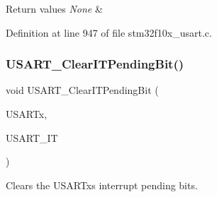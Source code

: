 \begin{DoxyRetVals}{Return values}
{\em None} & \\
\hline
\end{DoxyRetVals}


Definition at line 947 of file stm32f10x\+\_\+usart.\+c.

\mbox{\label{group___u_s_a_r_t___private___functions_ga1fc25d0338695063be5e50156955d9bc}} 
\subsubsection{\texorpdfstring{U\+S\+A\+R\+T\+\_\+\+Clear\+I\+T\+Pending\+Bit()}{USART\_ClearITPendingBit()}}
{\footnotesize\ttfamily void U\+S\+A\+R\+T\+\_\+\+Clear\+I\+T\+Pending\+Bit (\begin{DoxyParamCaption}\item[{\hyperlink{struct_u_s_a_r_t___type_def}{U\+S\+A\+R\+T\+\_\+\+Type\+Def} $\ast$}]{U\+S\+A\+R\+Tx,  }\item[{uint16\+\_\+t}]{U\+S\+A\+R\+T\+\_\+\+IT }\end{DoxyParamCaption})}



Clears the U\+S\+A\+R\+Tx\textquotesingle{}s interrupt pending bits. 


